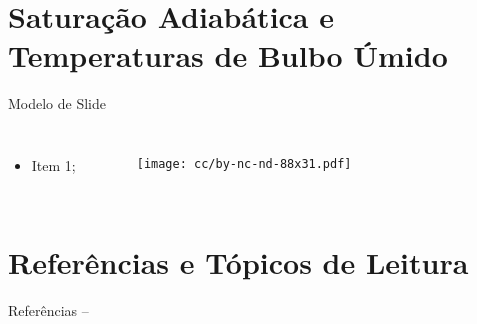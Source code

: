\section{Saturação Adiabática e Temperaturas de Bulbo Úmido}

    \begin{frame}{Modelo de Slide}\vspace*{-2em}
        \begin{columns}
            \begin{itemize}
                \item<1-> Item 1;
            \end{itemize}
            \begin{figure}
                \texttt{[image: cc/by-nc-nd-88x31.pdf]}
            \end{figure}
        \end{columns}
    \end{frame}

\section{Referências e Tópicos de Leitura}

    \begin{frame}[allowframebreaks]{Referências -- }
        
        
    \end{frame}




